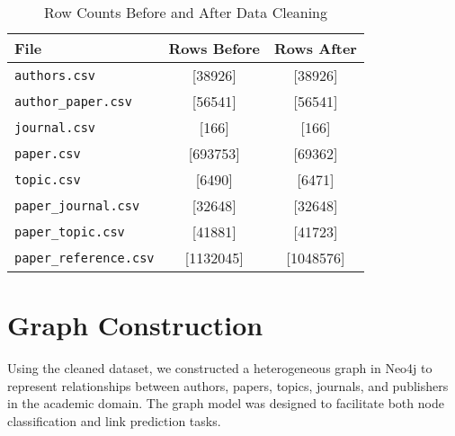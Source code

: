 \documentclass[conference, 12pt]{IEEEtran}
\begin{document}
\begin{table}[h]
\centering
\caption{Row Counts Before and After Data Cleaning}
\label{tab:cleaning_stats}
\begin{tabular}{|l|c|c|}
\hline
\textbf{File} & \textbf{Rows Before} & \textbf{Rows After} \\
\hline
\texttt{authors.csv} & [38926] & [38926] \\
\texttt{author\_paper.csv} & [56541] & [56541] \\
\texttt{journal.csv} & [166] & [166] \\
\texttt{paper.csv} & [693753] & [69362] \\
\texttt{topic.csv} & [6490] & [6471] \\
\texttt{paper\_journal.csv} & [32648] & [32648] \\
\texttt{paper\_topic.csv} & [41881] & [41723] \\
\texttt{paper\_reference.csv} & [1132045] & [1048576] \\
\hline
\end{tabular}
\end{table}

\section{Graph Construction}
Using the cleaned dataset, we constructed a heterogeneous graph in Neo4j to represent relationships between authors, papers, topics, journals, and publishers in the academic domain. The graph model was designed to facilitate both node classification and link prediction tasks.
\end{document}
